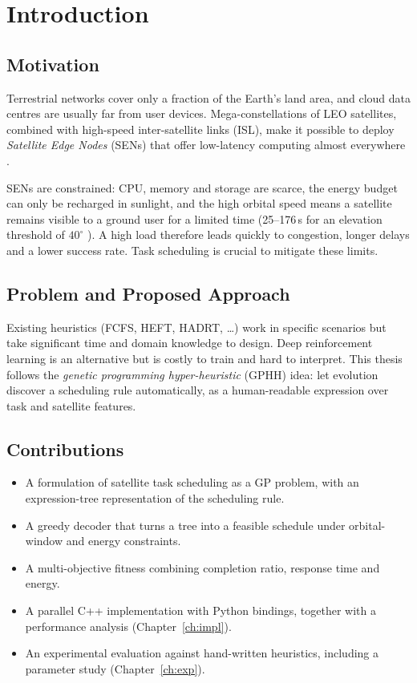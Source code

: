 \chapter{Introduction}

\section{Motivation}
Terrestrial networks cover only a fraction of the Earth's land area, and cloud
data centres are usually far from user devices. Mega-constellations of LEO
satellites, combined with high-speed inter-satellite links (ISL), make it
possible to deploy \emph{Satellite Edge Nodes} (SENs) that offer low-latency
computing almost everywhere \citep{icdcs_sc,magliarisi2025orbit}.

SENs are constrained: CPU, memory and storage are scarce, the energy budget can
only be recharged in sunlight, and the high orbital speed means a satellite
remains visible to a ground user for a limited time (25--176\,s for an elevation
threshold of $40^\circ$ \citep{magliarisi2025orbit}). A high load therefore
leads quickly to congestion, longer delays and a lower success rate. Task
scheduling is crucial to mitigate these limits.

\section{Problem and Proposed Approach}
Existing heuristics (FCFS, HEFT, HADRT, \dots) work in specific scenarios but
take significant time and domain knowledge to design. Deep reinforcement
learning is an alternative but is costly to train and hard to interpret. This
thesis follows the \emph{genetic programming hyper-heuristic} (GPHH) idea: let
evolution discover a scheduling rule automatically, as a human-readable
expression over task and satellite features.

\section{Contributions}
\begin{itemize}
  \item A formulation of satellite task scheduling as a GP problem, with an
        expression-tree representation of the scheduling rule.
  \item A greedy decoder that turns a tree into a feasible schedule under
        orbital-window and energy constraints.
  \item A multi-objective fitness combining completion ratio, response time and energy.
  \item A parallel C++ implementation with Python bindings, together with a
        performance analysis (Chapter~\ref{ch:impl}).
  \item An experimental evaluation against hand-written heuristics, including a parameter study (Chapter~\ref{ch:exp}).
\end{itemize}

